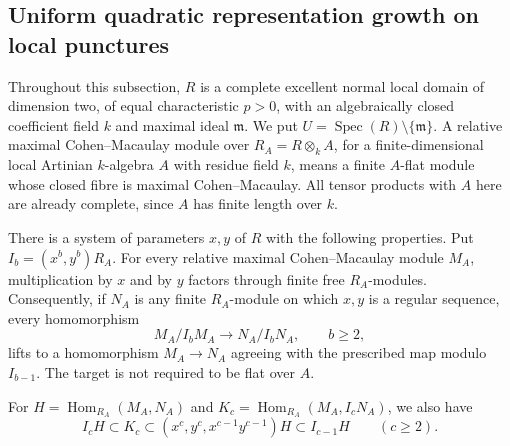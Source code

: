 \subsection{Uniform quadratic representation growth on local punctures}

Throughout this subsection, \(R\) is a complete excellent normal local
domain of dimension two, of equal characteristic \(p>0\), with an
algebraically closed coefficient field \(k\) and maximal ideal
\(\mathfrak m\). We put \(U=\operatorname{Spec}(R)\setminus\{\mathfrak m\}\).
A relative maximal Cohen--Macaulay module over
\(R_A=R\otimes_k A\), for a finite-dimensional local Artinian \(k\)-algebra \(A\)
with residue field \(k\), means
a finite \(A\)-flat module whose closed fibre is maximal
Cohen--Macaulay. All tensor products with \(A\) here are already complete,
since \(A\) has finite length over \(k\).

\begin{lemma}
\label{D:relative-Noether-different-jets}
There is a system of parameters \(x,y\) of \(R\) with the following
properties. Put \(I_b=(x^b,y^b)R_A\).
For every relative maximal Cohen--Macaulay module \(M_A\),
multiplication by \(x\) and by \(y\) factors through finite free
\(R_A\)-modules. Consequently, if \(N_A\) is any finite \(R_A\)-module
on which \(x,y\) is a regular sequence, every homomorphism
\[
 M_A/I_bM_A\longrightarrow N_A/I_bN_A,\qquad b\geq2,
\]
lifts to a homomorphism \(M_A\to N_A\) agreeing with the prescribed
map modulo \(I_{b-1}\).
The target is not required to be flat over \(A\).

For \(H=\operatorname{Hom}_{R_A}(M_A,N_A)\) and
\(K_c=\operatorname{Hom}_{R_A}(M_A,I_cN_A)\), we also have
\[
 I_cH\subset K_c
 \subset (x^c,y^c,x^{c-1}y^{c-1})H
 \subset I_{c-1}H \qquad(c\geq2).
 \tag{L1}
\]
\end{lemma}

